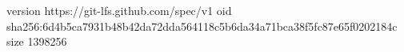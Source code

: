 version https://git-lfs.github.com/spec/v1
oid sha256:6d4b5ca7931b48b42da72dda564118c5b6da34a71bca38f5fc87e65f0202184c
size 1398256
